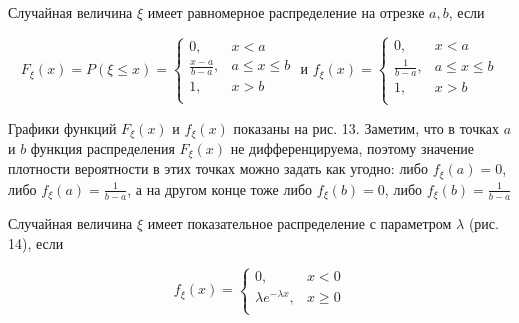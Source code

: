 \begin{definition}
Случайная величина $\xi$ имеет равномерное распределение на отрезке $a, b$, если

\begin{equation*}
	F_{\xi}(x) = P(\xi \leq x) = 
	\left\{
	\begin{aligned}
		0, & x<a\\
		\frac{x-a}{b-a}, & a \leq x \leq b\\
		1, & x>b\\
	\end{aligned}\right. \text{ и } f_{\xi}(x) = 
	\left\{
	\begin{aligned}
		0, & x<a\\
		\frac{1}{b-a}, & a \leq x \leq b\\
		1, & x>b\\
	\end{aligned}\right.
\end{equation*}

Графики функций $F_{\xi}(x)$ и $f_{\xi}(x)$ показаны на рис. 13. Заметим, что в точках $a$ и $b$ функция распределения $F_{\xi}(x)$ не дифференцируема, поэтому значение плотности вероятности в этих точках можно задать как угодно: либо $f_{\xi}(a) = 0$, либо $f_{\xi}(a) = \frac{1}{b-a}$, а на другом конце тоже либо $f_{\xi}(b) = 0$, либо $f_{\xi}(b) = \frac{1}{b-a}$
\end{definition}
	
\begin{definition}
Случайная величина $\xi$ имеет показательное распределение с параметром $\lambda$ (рис. 14), если

\begin{equation*}
	f_{\xi}(x) = 
	\left\{
	\begin{aligned}
		0, & x<0\\
		\lambda e^{-\lambda x}, & x \geq 0\\
	\end{aligned}\right.
\end{equation*}
\end{definition}

